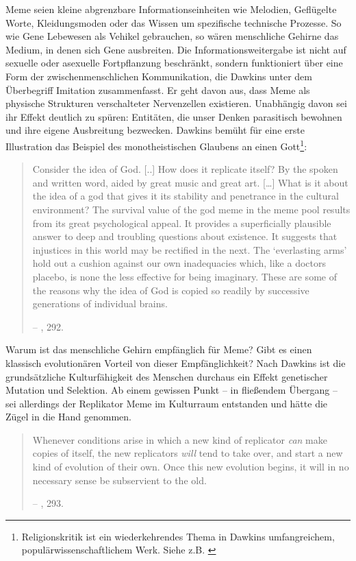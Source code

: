 \documentclass[openany,twoside,twocolumn]{book}
\let\rmarkdownfootnote\footnote%
\def\footnote{\protect\rmarkdownfootnote}
\begin{document}
Meme seien kleine abgrenzbare Informationseinheiten wie Melodien,
Geflügelte Worte, Kleidungsmoden oder das Wissen um spezifische
technische Prozesse. So wie Gene Lebewesen als Vehikel gebrauchen, so
wären menschliche Gehirne das Medium, in denen sich Gene ausbreiten. Die
Informationsweitergabe ist nicht auf sexuelle oder asexuelle
Fortpflanzung beschränkt, sondern funktioniert über eine Form der
zwischenmenschlichen Kommunikation, die Dawkins unter dem Überbegriff
Imitation zusammenfasst. Er geht davon aus, dass Meme als physische
Strukturen verschalteter Nervenzellen existieren. Unabhängig davon sei
ihr Effekt deutlich zu spüren: Entitäten, die unser Denken parasitisch
bewohnen und ihre eigene Ausbreitung bezwecken. Dawkins bemüht für eine
erste Illustration das Beispiel des monotheistischen Glaubens an einen
Gott\footnote{Religionskritik ist ein wiederkehrendes Thema in Dawkins
  umfangreichem, populärwissenschaftlichem Werk. Siehe z.B.
  \textcite{dawkins_god_2006}}:

\begin{quote}
Consider the idea of God. {[}..{]} How does it replicate itself? By the
spoken and written word, aided by great music and great art.
{[}\ldots{}{]} What is it about the idea of a god that gives it its
stability and penetrance in the cultural environment? The survival value
of the god meme in the meme pool results from its great psychological
appeal. It provides a superficially plausible answer to deep and
troubling questions about existence. It suggests that injustices in this
world may be rectified in the next. The `everlasting arms' hold out a
cushion against our own inadequacies which, like a doctors placebo, is
none the less effective for being imaginary. These are some of the
reasons why the idea of God is copied so readily by successive
generations of individual brains.

-- \textcite{Dawkinsselfishgene40th2016}, 292.
\end{quote}

Warum ist das menschliche Gehirn empfänglich für Meme? Gibt es einen
klassisch evolutionären Vorteil von dieser Empfänglichkeit? Nach Dawkins
ist die grundsätzliche Kulturfähigkeit des Menschen durchaus ein Effekt
genetischer Mutation und Selektion. Ab einem gewissen Punkt -- in
fließendem Übergang -- sei allerdings der Replikator Meme im Kulturraum
entstanden und hätte die Zügel in die Hand genommen.

\begin{quote}
Whenever conditions arise in which a new kind of replicator \emph{can}
make copies of itself, the new replicators \emph{will} tend to take
over, and start a new kind of evolution of their own. Once this new
evolution begins, it will in no necessary sense be subservient to the
old.

-- \textcite{Dawkinsselfishgene40th2016}, 293.
\end{quote}
\end{document}
